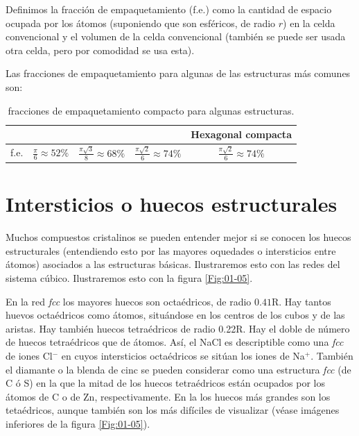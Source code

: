 \begin{definition} Definimos la fracción de empaquetamiento (f.e.) como la cantidad de espacio ocupada por los átomos (suponiendo que son esféricos, de radio $r$) en la celda convencional y el volumen de la celda convencional (también se puede ser usada otra celda, pero por comodidad se usa esta).	
\end{definition}
Las fracciones de empaquetamiento para algunas de las estructuras más comunes son: 

\begin{table}[h!] \centering
	\begin{tabular}{c|c|c|c|c}
	 &	\sc  & \bcc & \fcc & Hexagonal compacta \\ \hline \vspace{0.5cm}
	 f.e. & $\frac{\pi}{6} \approx 52\%$ & $\frac{\pi \sqrt{3}}{8} \approx 68\%$ & $\frac{\pi \sqrt{2}}{6} \approx 74\%$ & $\frac{\pi \sqrt{2}}{6} \approx 74\%$ 
	\end{tabular}
	\caption{fracciones de empaquetamiento compacto para algunas estructuras.}
\end{table}


\section{Intersticios o huecos estructurales}

Muchos compuestos cristalinos se pueden entender mejor si se conocen los huecos estructurales (entendiendo esto por las mayores oquedades o intersticios entre átomos) asociados a las estructuras básicas. Ilustraremos esto con las redes del sistema cúbico. Ilustraremos esto con la figura \ref{Fig:01-05}.

En la red \textit{fcc} los mayores huecos son octaédricos, de radio $0.41$R. Hay tantos huevos octaédricos como átomos, situándose en los centros de los cubos y de las aristas. Hay también huecos tetraédricos de radio 0.22R. Hay el doble de número de huecos tetraédricos que de átomos. Así, el NaCl es descriptible como una {\it fcc} de iones Cl$^-$ en cuyos intersticios octaédricos se sitúan los iones de Na$^+$. También el diamante o la blenda de cinc se pueden considerar como una estructura {\it fcc} (de C ó S) en la que la mitad de los huecos tetraédricos están ocupados por los átomos de C o de Zn, respectivamente. En la \bcc  los huecos más grandes son los tetaédricos, aunque también son los más difíciles de visualizar (véase imágenes inferiores de la figura \ref{Fig:01-05}).

